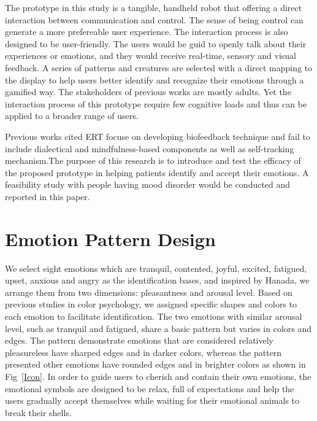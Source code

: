 \documentclass[manuscript,screen]{acmart}
\begin{document}
The prototype in this study is a tangible, handheld robot that offering a direct interaction between communication and control. The sense of being control can generate a more prefereable user experience.\cite{hauge2002understanding} The interaction process is also designed to be user-friendly. The users would be guid to openly talk about their experiences or emotions, and they would receive real-time, sensory and visual feedback. A series of patterns and creatures are selected with a direct mapping to the display to help users better identify and recognize their emotions through a gamified way. The stakeholders of previous works are mostly adults. Yet the interaction process of this prototype require few cognitive loads and thus can be applied to a broader range of users. 

Previous works cited ERT focuse on developing biofeedback technique and fail to include dialectical and mindfulness-based components as well as self-tracking mechanism.\cite{arnrich2010pervasive}\cite{hao2014visual}The purpose of this research is to introduce and test the efficacy of the proposed prototype in helping patients identify and accept their emotions. A feasibility study with people having mood disorder would be conducted and reported in this paper.

\section{Emotion Pattern Design}

We select eight emotions which are tranquil, contented, joyful, excited, fatigued, upset, anxious and angry as the identification bases, and inspired by Hanada,\cite{hanada2018correspondence}
we arrange them from two dimensions: pleasantness and arousal level. Based on previous studies in color psychology,\cite{valdez1994effects}
we assigned specific shapes and colors to each emotion to facilitate identification. The two emotions with similar arousal level, such as tranquil and fatigued, share a basic pattern but varies in colors and edges. The pattern demonstrate emotions that are considered relatively pleasureless have sharped edges and in darker colors, whereas the pattern presented other emotions have rounded edges and in brighter colors as shown in Fig~\ref{Icon}. In order to guide users to cherish and contain their own emotions, the emotional symbols are designed to be relax, full of expectations and help the users gradually accept themselves while waiting for their emotional animals to break their shells.
\end{document}
